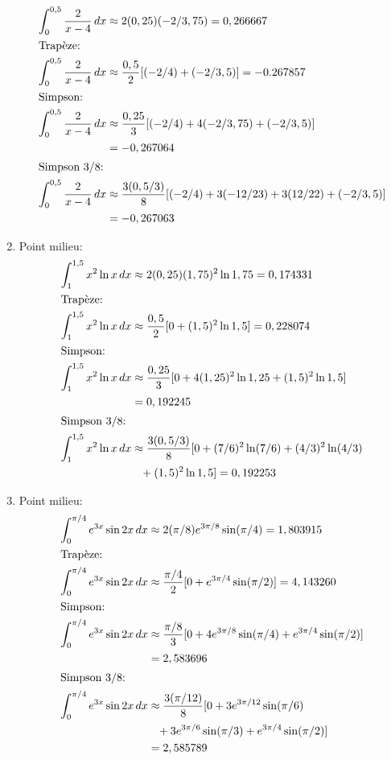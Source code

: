 \begin{exercice}
\begin{sol}
\begin{enumerate}
\begin{align*}
        \int_0^{0,5} \frac{2}{x - 4}\, dx &\approx
        2(0,25) (-2/3,75) = 0,266667 \\
        \intertext{Trapèze:}
        \int_0^{0,5} \frac{2}{x - 4}\, dx &\approx
        \frac{0,5}{2} [(-2/4) + (-2/3,5)] = -0.267857 \\
        \intertext{Simpson:}
        \int_0^{0,5} \frac{2}{x - 4}\, dx &\approx
        \frac{0,25}{3} [(-2/4) + 4(-2/3,75) + (-2/3,5)] \\
        &= -0,267064 \\
        \intertext{Simpson 3/8:}
        \int_0^{0,5} \frac{2}{x - 4}\, dx &\approx
        \frac{3(0,5/3)}{8} [(-2/4) + 3(-12/23) + 3(12/22) + (-2/3,5)] \\
        &= -0,267063
      \end{align*}
    \item Point milieu:
      \begin{align*}
        \int_1^{1,5} x^2 \ln x\, dx &\approx
        2(0,25) (1,75)^2 \ln 1,75 = 0,174331 \\
        \intertext{Trapèze:}
        \int_1^{1,5} x^2 \ln x\, dx &\approx
        \frac{0,5}{2} [0 + (1,5)^2 \ln 1,5] = 0,228074 \\
        \intertext{Simpson:}
        \int_1^{1,5} x^2 \ln x\, dx &\approx
        \frac{0,25}{3} [0 + 4 (1,25)^2 \ln 1,25 + (1,5)^2 \ln 1,5] \\
        &= 0,192245 \\
        \intertext{Simpson 3/8:}
        \int_1^{1,5} x^2 \ln x\, dx &\approx
        \frac{3(0,5/3)}{8} [0 + (7/6)^2 \ln (7/6) + (4/3)^2 \ln (4/3) \\
        &\phantom{\approx} + (1,5)^2 \ln 1,5] = 0,192253
      \end{align*}
    \item Point milieu:
      \begin{align*}
        \int_0^{\pi/4} e^{3x} \sin 2x\, dx &\approx
        2(\pi/8) e^{3\pi/8} \sin (\pi/4) = 1,803915 \\
        \intertext{Trapèze:}
        \int_0^{\pi/4} e^{3x} \sin 2x\, dx &\approx
        \frac{\pi/4}{2} [0 + e^{3\pi/4} \sin (\pi/2)] = 4,143260 \\
        \intertext{Simpson:}
        \int_0^{\pi/4} e^{3x} \sin 2x\, dx &\approx
        \frac{\pi/8}{3} [0 + 4 e^{3\pi/8} \sin (\pi/4) + e^{3\pi/4}
        \sin (\pi/2)] \\
        &= 2,583696 \\
        \intertext{Simpson 3/8:}
        \int_0^{\pi/4} e^{3x} \sin 2x\, dx &\approx
        \frac{3(\pi/12)}{8} [0 + 3 e^{3\pi/12} \sin (\pi/6) \\
        &\phantom{\approx} + 3 e^{3\pi/6} \sin (\pi/3) +
        e^{3\pi/4} \sin (\pi/2)] \\
        &= 2,585789
      \end{align*}
    \end{enumerate}
  \end{sol}
\end{exercice}


